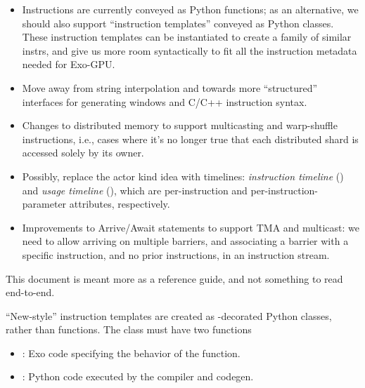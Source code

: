 \begin{itemize}
\item Instructions are currently conveyed as Python functions; as an alternative, we should also support ``instruction templates'' conveyed as Python classes.
These instruction templates can be instantiated to create a family of similar instrs, and give us more room syntactically to fit all the instruction metadata needed for Exo-GPU.
\item Move away from string interpolation and towards more ``structured'' interfaces for generating windows and C/C++ instruction syntax.
\item Changes to distributed memory to support multicasting and warp-shuffle instructions, i.e., cases where it's no longer true that each distributed shard is accessed solely by its owner.
\item Possibly, replace the actor kind idea with timelines: \textit{instruction timeline} () and \textit{usage timeline} (), which are per-instruction and per-instruction-parameter attributes, respectively.
\item Improvements to Arrive/Await statements to support TMA and multicast: we need to allow arriving on multiple barriers, and associating a barrier with a specific instruction, and no prior instructions, in an instruction stream.
\end{itemize}

\filbreak
{}

This document is meant more as a reference guide, and not something to read end-to-end.

{\sffamily
{}







}

\newpage
{}
\label{ch:InstrClass}

``New-style'' instruction templates are created as -decorated Python classes, rather than functions.
The class must have two functions
\begin{itemize}
  \item {}: Exo code specifying the behavior of the function.
  \item {}: Python code executed by the compiler and codegen.
\end{itemize}

